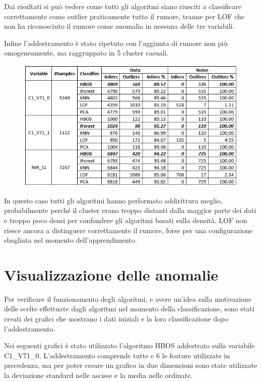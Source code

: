 Dai risultati si può vedere come tutti gli algoritmi siano riusciti a classificare correttamente come outlier praticamente tutto il rumore, tranne per LOF che non ha riconosciuto il rumore come anomalia in nessuna delle tre variabili.

Infine l'addestramento è stato ripetuto con l'aggiunta di rumore non più omogeneamente, ma raggruppato in 5 cluster casuali.

\begin{figure} [H]
	\includegraphics[width=\textwidth]{figures/cluster_noise}
	
\end{figure}

In questo caso tutti gli algoritmi hanno performato addirittura meglio, probabilmente perché il cluster erano troppo distanti dalla maggior parte dei dati e troppo poco densi per confondere gli algoritmi basati sulla densità. LOF non riesce ancora a distinguere correttamente il rumore, forse per una configurazione sbagliata nel momento dell'apprendimento.

\section{Visualizzazione delle anomalie}

Per verificare il funzionamento degli algoritmi, e avere un'idea sulla motivazione delle scelte effettuate dagli algoritmi nel momento della classificazione, sono stati creati dei grafici che mostrano i dati iniziali e la loro classificazione dopo l'addestramento.

Nei seguenti grafici è stato utilizzato l'algoritmo HBOS addestrato sulla variabile C1\_V71\_0. L'addestramento comprende tutte e 6 le feature utilizzate in precedenza, ma per poter creare un grafico in due dimensioni sono state utilizzate la deviazione standard nelle ascisse e la media nelle ordinate.

